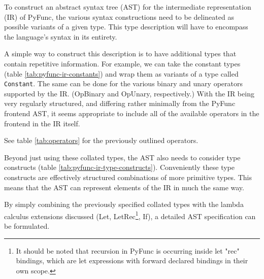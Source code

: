 \documentclass{l4proj}
\begin{document}
To construct an abstract syntax tree (AST) for the intermediate representation (IR) of PyFunc, the various syntax constructions need to be delineated as possible variants of a given type.
This type description will have to encompass the language's syntax in its entirety.

A simple way to construct this description is to have additional types that contain repetitive information.
For example, we can take the constant types (table \ref{tab:pyfunc-ir-constants}) and wrap them as variants of a type called \texttt{Constant}.
The same can be done for the various binary and unary operators supported by the IR.
(OpBinary and OpUnary, respectively.)
With the IR being very regularly structured, and differing rather minimally from the PyFunc frontend AST, it seems appropriate to include all of the available operators in the frontend in the IR itself.

See table \ref{tab:operators} for the previously outlined operators.

Beyond just using these collated types, the AST also needs to consider type constructs (table \ref{tab:pyfunc-ir-type-constructs}).
Conveniently these type constructs are effectively structured combinations of more primitive types.
This means that the AST can represent elements of the IR in much the same way.

By simply combining the previously specified collated types with the lambda calculus extensions discussed (Let, LetRec\footnote{It should be noted that recursion in PyFunc is occurring inside let "rec" bindings, which are let expressions with forward declared bindings in their own scope.}, If), a detailed AST specification can be formulated.
\end{document}
